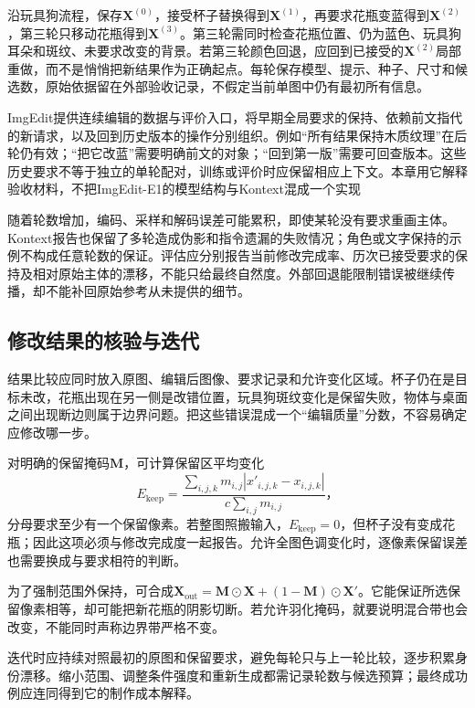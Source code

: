 沿玩具狗流程，保存$\bm{X}^{(0)}$，接受杯子替换得到$\bm{X}^{(1)}$，再要求花瓶变蓝得到$\bm{X}^{(2)}$，第三轮只移动花瓶得到$\bm{X}^{(3)}$。第三轮需同时检查花瓶位置、仍为蓝色、玩具狗耳朵和斑纹、未要求改变的背景。若第三轮颜色回退，应回到已接受的$\bm{X}^{(2)}$局部重做，而不是悄悄把新结果作为正确起点。每轮保存模型、提示、种子、尺寸和候选数，原始依据留在外部验收记录，不假定当前单图中仍有最初所有信息。

ImgEdit提供连续编辑的数据与评价入口，将早期全局要求的保持、依赖前文指代的新请求，以及回到历史版本的操作分别组织。例如“所有结果保持木质纹理”在后轮仍有效；“把它改蓝”需要明确前文的对象；“回到第一版”需要可回查版本。这些历史要求不等于独立的单轮配对，训练或评价时应保留相应上下文。本章用它解释验收材料，不把ImgEdit-E1的模型结构与Kontext混成一个实现

随着轮数增加，编码、采样和解码误差可能累积，即使某轮没有要求重画主体。Kontext报告也保留了多轮造成伪影和指令遗漏的失败情况；角色或文字保持的示例不构成任意轮数的保证。评估应分别报告当前修改完成率、历次已接受要求的保持及相对原始主体的漂移，不能只给最终自然度。外部回退能限制错误被继续传播，却不能补回原始参考从未提供的细节。

\subsection{修改结果的核验与迭代}
\label{sec:vision-generation-editing-check}

结果比较应同时放入原图、编辑后图像、要求记录和允许变化区域。杯子仍在是目标未改，花瓶出现在另一侧是改错位置，玩具狗斑纹变化是保留失败，物体与桌面之间出现断边则属于边界问题。把这些错误混成一个“编辑质量”分数，不容易确定应修改哪一步。

对明确的保留掩码$\bm{M}$，可计算保留区平均变化
\begin{equation}
 E_{\mathrm{keep}}=
 \frac{\sum_{i,j,k}m_{i,j}
       |x'_{i,j,k}-x_{i,j,k}|}
 {c\sum_{i,j}m_{i,j}}\text{，}
 \label{eq:vision-edit-preservation}
\end{equation}
分母要求至少有一个保留像素。若整图照搬输入，$E_{\mathrm{keep}}=0$，但杯子没有变成花瓶；因此这项必须与修改完成度一起报告。允许全图色调变化时，逐像素保留误差也需要换成与要求相符的判断。

为了强制范围外保持，可合成$\bm{X}_{\mathrm{out}}=\bm{M}\odot\bm{X}+(1-\bm{M})\odot\bm{X}'$。它能保证所选保留像素相等，却可能把新花瓶的阴影切断。若允许羽化掩码，就要说明混合带也会改变，不能同时声称边界带严格不变。

迭代时应持续对照最初的原图和保留要求，避免每轮只与上一轮比较，逐步积累身份漂移。缩小范围、调整条件强度和重新生成都需记录轮数与候选预算；最终成功例应连同得到它的制作成本解释。

